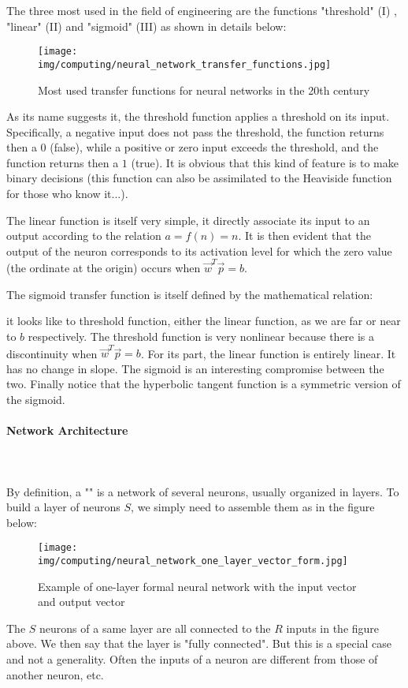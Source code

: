 	The three most used in the field of engineering are the functions "threshold" (I) , "linear" (II) and "sigmoid" (III) as shown in details below:
	\begin{figure}[H]
		\centering
		\texttt{[image: img/computing/neural\_network\_transfer\_functions.jpg]}
		\caption{Most used transfer functions for neural networks in the 20th century}
	\end{figure}
	As its name suggests it, the threshold function applies a threshold on its input. Specifically, a negative input does not pass the threshold, the function returns then a $0$ (false), while a positive or zero input exceeds the threshold, and the function returns then a $1$ (true). It is obvious that this kind of feature is to make binary decisions (this function can also be assimilated to the Heaviside function for those who know it...).
	
	The linear function is itself very simple, it directly associate its input to an output according to the relation $a=f(n)=n$. It is then evident that the output of the neuron corresponds to its activation level for which the zero value (the ordinate at the origin) occurs when $\vec{w}^T\vec{p}=b$.
	
	The sigmoid transfer function is itself defined by the mathematical relation:
	
	it looks like to threshold function, either the linear function, as we are far or near to $b$ respectively. The threshold function is very nonlinear because there is a discontinuity when $\vec{w}^T\vec{p}=b$. For its part, the linear function is entirely linear. It has no change in slope. The sigmoid is an interesting compromise between the two. Finally notice that the hyperbolic tangent function is a symmetric version of the sigmoid.
	
	
	\paragraph{Network Architecture}\mbox{}\\\\
	By definition, a "" is a network of several neurons, usually organized in layers. To build a layer of neurons $S$, we simply need to assemble them as in the figure below:
	\begin{figure}[H]
		\centering
		\texttt{[image: img/computing/neural\_network\_one\_layer\_vector\_form.jpg]}
		\caption{Example of one-layer formal neural network with the input vector and output vector}
	\end{figure}
	The $S$ neurons of a same layer are all connected to the $R$ inputs in the figure above. We then say that the layer is "fully connected". But this is a special case and not a generality. Often the inputs of a neuron are different from those of another neuron, etc.
	

